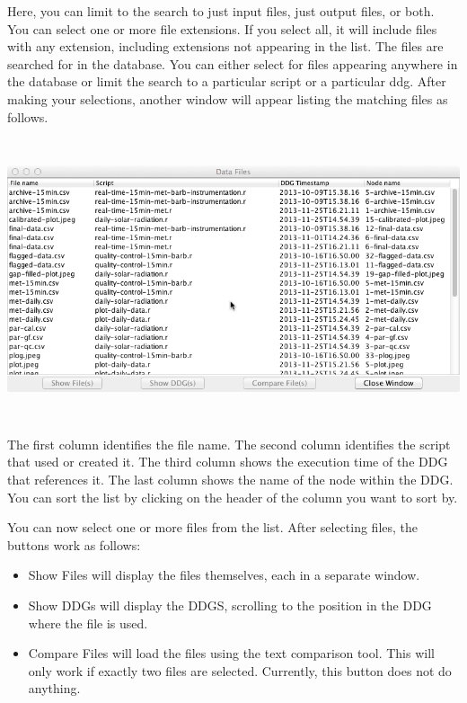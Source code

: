\documentclass[12pt]{article}
\newcommand\liststyleWWviiiNumvii{%
\renewcommand\labelitemi{•}
\renewcommand\labelitemii{•}
\renewcommand\labelitemiii{•}
\renewcommand\labelitemiv{•}
}
\begin{document}
{{\mdseries\upshape\color{black}
Here, you can limit to the search to just input files, just output files, or both. You can select one or more file extensions. If you select all, it will include files with any extension, including extensions not appearing in the list. The files are searched for in the database. You can either select for files appearing anywhere in the database or limit the search to a particular script or a particular ddg. After making your selections, another window will appear listing the matching files as follows.}

 \includegraphics[width=6.5in,height=3.25in]{UsingDDGExplorer-img/UsingDDGExplorer-img013.png} 

{\mdseries\upshape\color{black}
The first column identifies the file name. The second column identifies the script that used or created it. The third column shows the execution time of the DDG that references it. The last column shows the name of the node within the DDG. You can sort the list by clicking on the header of the column you want to sort by.}

{\mdseries\upshape\color{black}
You can now select one or more files from the list. After selecting files, the buttons work as follows:}

\liststyleWWviiiNumvii
\begin{itemize}
\item {\color{black}
Show Files will display the files themselves, each in a separate window.}
\item {\color{black}
Show DDGs will display the DDGS, scrolling to the position in the DDG where the file is used.}
\item {\color{black}
Compare Files will load the files using the text comparison tool. This will only work if exactly two files are selected. Currently, this button does not do anything. }
\end{itemize}
}
\end{document}
